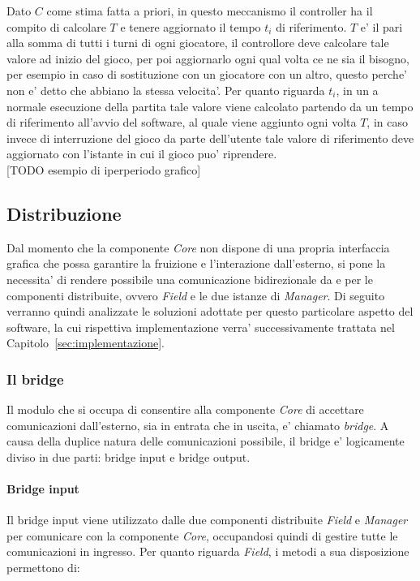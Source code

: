 Dato $C$ come stima fatta a priori, in questo meccanismo il controller ha il compito di calcolare $T$ e tenere aggiornato il tempo $t_i$ di riferimento. $T$ e' il pari alla somma di tutti i turni di ogni giocatore, il controllore deve calcolare tale valore ad inizio del gioco, per poi aggiornarlo ogni qual volta ce ne sia il bisogno, per esempio in caso di sostituzione con un giocatore con un altro, questo perche' non e' detto che abbiano la stessa velocita'. Per quanto riguarda $t_i$, in un
a normale esecuzione della partita tale valore viene calcolato partendo da un tempo di riferimento all'avvio del software, al quale viene aggiunto ogni volta $T$, in caso invece di interruzione del gioco da parte dell'utente tale valore di riferimento deve aggiornato con l'istante in cui il gioco puo' riprendere.\\

[TODO esempio di iperperiodo grafico]

\subsection{Distribuzione}
\label{sec:analisi_distribuzione}

Dal momento che la componente \textit{Core} non dispone di una propria interfaccia grafica che possa garantire la fruizione e l'interazione dall'esterno, si pone la necessita' di rendere possibile una comunicazione bidirezionale da e per le componenti distribuite, ovvero \textit{Field} e le due istanze di \textit{Manager}. Di seguito verranno quindi analizzate le soluzioni adottate per questo particolare aspetto del software, la cui rispettiva implementazione verra' successivamente trattata nel Capitolo~\ref{sec:implementazione}.

\subsubsection{Il bridge}
\label{sec:analisi_distribuzione_bridge}

Il modulo che si occupa di consentire alla componente \textit{Core} di accettare comunicazioni dall'esterno, sia in entrata che in uscita, e' chiamato \textit{bridge}. A causa della duplice natura delle comunicazioni possibile, il bridge e' logicamente diviso in due parti: bridge input e bridge output.

\paragraph{Bridge input}\label{sec:analisi_distribuzione_bridge_input} Il bridge input viene utilizzato dalle due componenti distribuite \textit{Field} e \textit{Manager} per comunicare con la componente \textit{Core}, occupandosi quindi di gestire tutte le comunicazioni in ingresso. Per quanto riguarda \textit{Field}, i metodi a sua disposizione permettono di:

